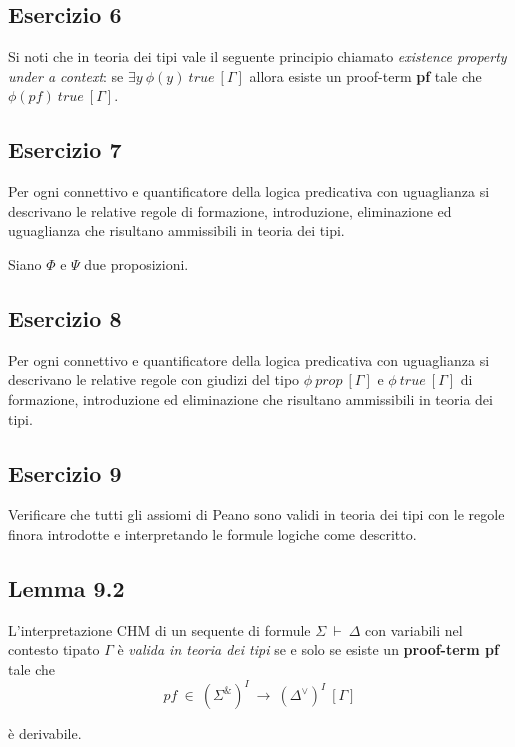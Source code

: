 \subsection{Esercizio 6}
\begin{thm}
	Si noti che in teoria dei tipi vale il seguente principio chiamato \textit{existence property under a context}: se $\exists y~\phi(y)~true~[\Gamma]$ allora esiste un proof-term \textbf{pf} tale che $\phi(pf)~true~[\Gamma]$.
\end{thm}


\subsection{Esercizio 7}
\begin{thm}
	Per ogni connettivo e quantificatore della logica predicativa con uguaglianza si descrivano le relative regole di formazione, introduzione, eliminazione ed uguaglianza che risultano ammissibili in teoria dei tipi.
\end{thm}
Siano $\Phi$ e $\Psi$ due proposizioni.


\subsection{Esercizio 8}
\begin{thm}
	Per ogni connettivo e quantificatore della logica predicativa con uguaglianza si descrivano le relative regole con giudizi del tipo $\phi~prop~[\Gamma]$ e $\phi~true~[\Gamma]$ di formazione, introduzione ed eliminazione che risultano ammissibili in teoria dei tipi.
\end{thm}


\subsection{Esercizio 9}
\begin{thm}
	Verificare che tutti gli assiomi di Peano sono validi in teoria dei tipi con le regole finora introdotte e interpretando le formule logiche come descritto.
\end{thm}


\subsection{Lemma 9.2}
\begin{lem}
	L'interpretazione CHM di un sequente di formule $\Sigma~\vdash~\Delta$ con variabili nel contesto tipato $\Gamma$ è \textit{valida in teoria dei tipi} se e solo se esiste un \textbf{proof-term pf} tale che 
	\[pf~\in~(\Sigma^{\&})^I~\to~(\Delta^{\vee})^I~[\Gamma]\]
	
	è derivabile.
\end{lem}

